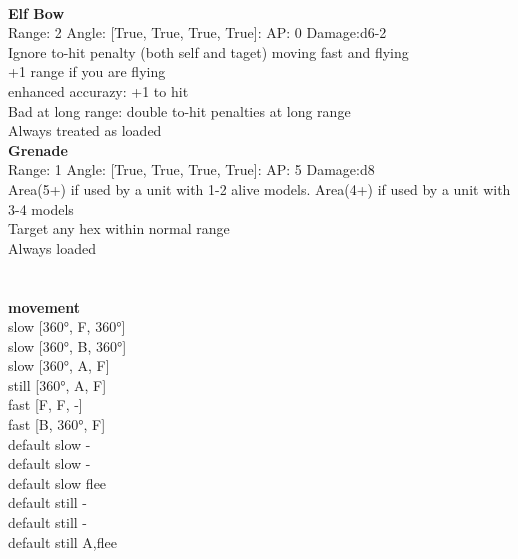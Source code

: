 \ \\
{\bf Elf Bow } \\



Range: 2  Angle: [True, True, True, True]: AP: 0 Damage:d6-2 \\
Ignore to-hit penalty (both self and taget) moving fast and flying\\ 
+1 range if you are flying\\ 
enhanced accurazy: +1 to hit\\ 
Bad at long range: double to-hit penalties at long range\\ 
Always treated as loaded\\ 




{\bf Grenade } \\



Range: 1  Angle: [True, True, True, True]: AP: 5 Damage:d8 \\
Area(5+) if used by a unit with 1-2 alive models. Area(4+) if used by a unit with 3-4 models\\ 
Target any hex within normal range\\ 
Always loaded\\ 




 
\ \\



\ \\ {\bf movement } \\
slow [360°, F, 360°] \\
slow [360°, B, 360°] \\
slow [360°, A, F] \\
still [360°, A, F] \\
fast [F, F, -] \\
fast [B, 360°, F] \\
default slow - \\
default slow - \\
default slow flee \\
default still - \\
default still - \\
default still A,flee \\


